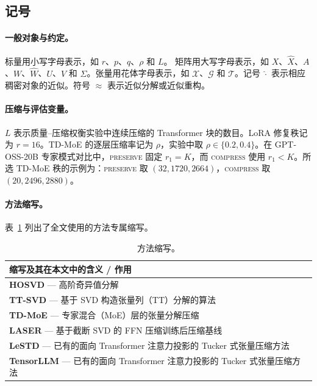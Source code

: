 
\newpage
\begin{appendixpart}
\vspace{-4mm}
\tableofcontents
\allowdisplaybreaks
\newpage

\section{记号}
\label{app:notation}

\paragraph{一般对象与约定。}
标量用小写字母表示，如 $r$、$p$、$q$、$\rho$ 和 $L$。
矩阵用大写字母表示，如 $X$、$\widehat{X}$、$A$、$W$、$\widehat{W}$、$U$、$V$ 和 $\Sigma$。张量用花体字母表示，如 $\mathcal{X}$、$\mathcal{G}$ 和 $\mathcal{T}$。记号 $\widehat{\cdot}$ 表示相应稠密对象的近似。符号 $\approx$ 表示近似分解或近似重构。


\paragraph{压缩与评估变量。}
$L$ 表示质量--压缩权衡实验中连续压缩的 Transformer 块的数目。LoRA 修复秩记为 $r=16$。TD-MoE 的逐层压缩率记为 $\rho$，实验中取 $\rho \in \{0.2,0.4\}$。在 GPT-OSS-20B 专家模式对比中，\textsc{preserve} 固定 $r_1=K$，而 \textsc{compress} 使用 $r_1<K$。所选 TD-MoE 秩的示例为：\textsc{preserve} 取 $(32,1720,2664)$，\textsc{compress} 取 $(20,2496,2880)$。

\paragraph{方法缩写。}
表~\ref{tab:method_abbreviations} 列出了全文使用的方法专属缩写。

\begin{table}[htbp]
\centering
\caption{方法缩写。}
\label{tab:method_abbreviations}
\small
\begin{tabular}{@{}p{\columnwidth}@{}}
\toprule
\textbf{缩写及其在本文中的含义 / 作用} \\
\midrule
\textbf{HOSVD} --- 高阶奇异值分解 \\
\textbf{TT-SVD} --- 基于 SVD 构造张量列（TT）分解的算法 \\
\textbf{TD-MoE} --- 专家混合（MoE）层的张量分解压缩 \\
\textbf{LASER} --- 基于截断 SVD 的 FFN 压缩训练后压缩基线 \\
\textbf{LeSTD} --- 已有的面向 Transformer 注意力投影的 Tucker 式张量压缩方法 \\
\textbf{TensorLLM} --- 已有的面向 Transformer 注意力投影的 Tucker 式张量压缩方法 \\
\bottomrule
\end{tabular}
\end{table}


\end{appendixpart}
